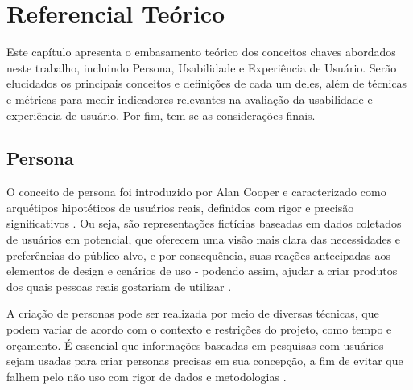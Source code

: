 \chapter[Referencial Teórico]{Referencial Teórico}

Este capítulo apresenta o embasamento teórico dos conceitos chaves abordados
neste trabalho, incluindo Persona, Usabilidade e Experiência de Usuário. Serão
elucidados os principais conceitos e definições de cada um deles, além de 
técnicas e métricas para medir indicadores relevantes na avaliação da 
usabilidade e experiência de usuário. Por fim, tem-se as considerações finais.

\section{Persona}
\label{sec:Persona}

O conceito de persona foi introduzido por Alan Cooper e caracterizado como 
arquétipos hipotéticos de usuários reais, definidos com rigor e precisão 
significativos \cite{cooper1999}. Ou seja, são representações fictícias 
baseadas em dados coletados de usuários em potencial, que oferecem uma visão 
mais clara das necessidades e preferências do público-alvo, e por consequência, 
suas reações antecipadas aos elementos de design e cenários de uso - podendo 
assim, ajudar a criar produtos dos quais pessoas reais gostariam de utilizar 
\cite{pruitt2006}.

A criação de personas pode ser realizada por meio de diversas técnicas, que 
podem variar de acordo com o contexto e restrições do projeto, como tempo e 
orçamento. É essencial que informações baseadas em pesquisas com usuários sejam 
usadas para criar personas precisas em sua concepção, a fim de evitar que falhem 
pelo não uso com rigor de dados e metodologias \cite{pruitt2006}.